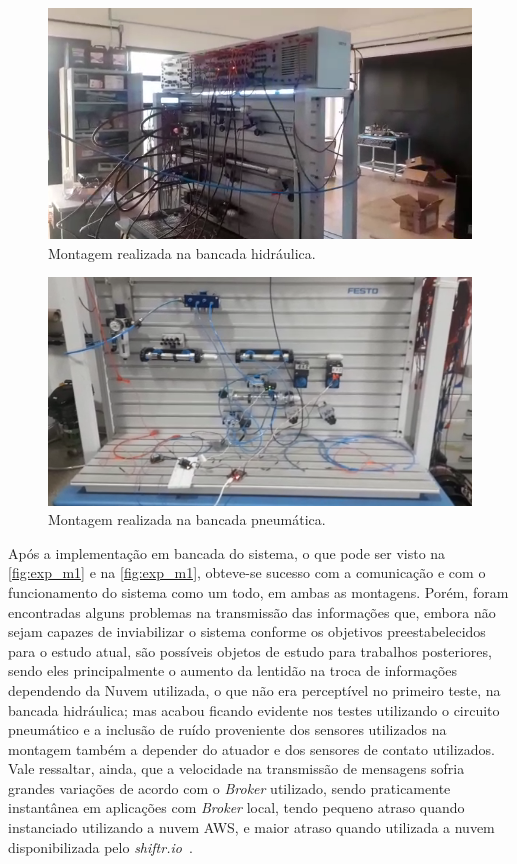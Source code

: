 \begin{figure}[htb]
    \begin{center}
        \includegraphics[scale=0.5]{figs/exp_h.png}
    \end{center}
    \caption{\label{fig:exp_m1} Montagem realizada na bancada hidráulica.} 
\end{figure}

\begin{figure}[htb]
    \begin{center}
	    \includegraphics[scale=0.5]{figs/exp_p.png}
	\end{center}
	\caption{\label{fig:exp_m2} Montagem realizada na bancada pneumática.} 
\end{figure}


Após a implementação em bancada do sistema, o que pode ser visto na \autoref{fig:exp_m1} e na \autoref{fig:exp_m1},
obteve-se sucesso com a comunicação e com o funcionamento do sistema como um todo,
em ambas as montagens. Porém, foram encontradas alguns problemas na transmissão das informações que, embora não sejam
capazes de inviabilizar o sistema conforme os objetivos preestabelecidos para o estudo atual, são possíveis objetos de 
estudo para trabalhos posteriores, sendo eles principalmente o aumento da lentidão na troca de informações dependendo da 
Nuvem utilizada, o que não era perceptível no primeiro teste, na bancada hidráulica; mas acabou ficando evidente nos testes
utilizando o circuito pneumático e a inclusão de ruído proveniente dos sensores utilizados na montagem
também a depender do atuador e dos sensores de contato utilizados. Vale ressaltar, ainda, que a velocidade na transmissão
de mensagens sofria grandes variações de acordo com o \textit{Broker} utilizado, sendo praticamente instantânea em aplicações com
\textit{Broker} local, tendo pequeno atraso quando instanciado utilizando a nuvem AWS, e maior atraso quando utilizada a
nuvem disponibilizada pelo \textit{shiftr.io}~\textregistered.